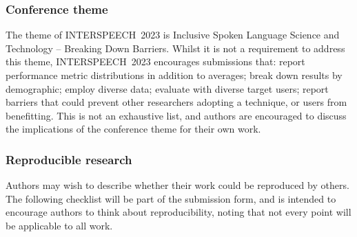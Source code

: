 \documentclass{INTERSPEECH2023}
\begin{document}
\subsubsection{Conference theme}

The theme of INTERSPEECH~2023 is Inclusive Spoken Language Science and Technology – Breaking Down Barriers. Whilst it is not a requirement to address this theme, INTERSPEECH~2023 encourages submissions that: report performance metric distributions in addition to averages; break down results by demographic; employ diverse data; evaluate with diverse target users; report barriers that could prevent other researchers adopting a technique, or users from benefitting. This is not an exhaustive list, and authors are encouraged to discuss the implications of the conference theme for their own work.

\subsubsection{Reproducible research}

Authors may wish to describe whether their work could be reproduced by others. The following checklist will be part of the submission form, and is intended to encourage authors to think about reproducibility, noting that not every point will be applicable to all work.

\end{document}
